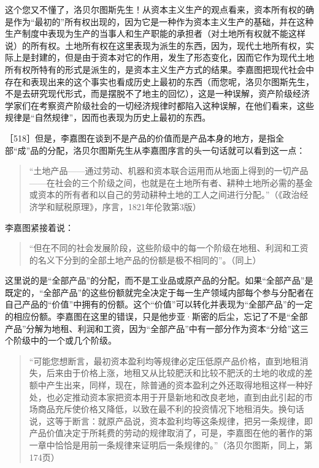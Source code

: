 这个您又不懂了，洛贝尔图斯先生！从资本主义生产的观点看来，资本所有权的确是作为“最初的”所有权出现的，因为它是一种作为资本主义生产的基础，并在这种生产制度中表现为生产的当事人和生产职能的承担者（对土地所有权就不能这样说）的所有权。土地所有权在这里表现为派生的东西，因为，现代土地所有权，实际上是封建的，但是由于资本对它的作用，发生了形态变化，因而它作为现代土地所有权所特有的形式是派生的，是资本主义生产方式的结果。李嘉图把现代社会中存在和表现出来的这个事实也看成历史上最初的东西（而您呢，洛贝尔图斯先生，不是去研究现代形式，而是摆脱不了地主的回忆），这是一种误解，资产阶级经济学家们在考察资产阶级社会的一切经济规律时都陷入这种误解，在他们看来，这些规律是“自然规律”，因而也表现为历史上最初的东西。

［518］但是，李嘉图在谈到不是产品的价值而是产品本身的地方，是指全部“成”品的分配，洛贝尔图斯先生从李嘉图序言的头一句话就可以看到这一点：

\begin{quote}{“土地产品——通过劳动、机器和资本联合运用而从地面上得到的一切产品——在社会的三个阶级之间，也就是在土地所有者、耕种土地所必需的基金或资本的所有者和以自己的劳动耕种土地的工人之间进行分配。”（《政治经济学和赋税原理》，序言，1821年伦敦第3版）}\end{quote}

李嘉图紧接着说：

\begin{quote}{“但在不同的社会发展阶段，这些阶级中的每一个阶级在地租、利润和工资的名义下分到的全部土地产品的份额是极不相同的”。（同上）}\end{quote}

这里说的是“全部产品”的分配，而不是工业品或原产品的分配。如果“全部产品”是既定的，“全部产品”的这些份额就完全决定于每一生产领域内部每个参与分配者在自己产品的“价值”中拥有的份额。这个“价值”可以转化并表现为“全部产品”的一定的相应份额。李嘉图在这里的错误，只是他步亚·斯密的后尘，忘记了不是“全部产品”分解为地租、利润和工资，因为“全部产品”中有一部分作为资本“分给”这三个阶级中的一个或几个阶级。

\begin{quote}{“可能您想断言，最初资本盈利均等规律必定压低原产品价格，直到地租消失，后来由于价格上涨，地租又从比较肥沃和比较不肥沃的土地的收成的差额中产生出来，同样，现在，除普通的资本盈利之外还取得地租这样一种好处，也必定推动资本家把资本用于开垦新地和改良老地，直到由此引起的市场商品充斥使价格又降低，以致在最不利的投资情况下地租消失。换句话说，这等于断言：就原产品说，资本盈利均等这条规律，把另一条规律，即产品价值决定于所耗费的劳动的规律取消了，可是，李嘉图在他的著作的第一章中恰恰是用前一条规律来证明后一条规律的。”（洛贝尔图斯，同上，第174页）}\end{quote}

